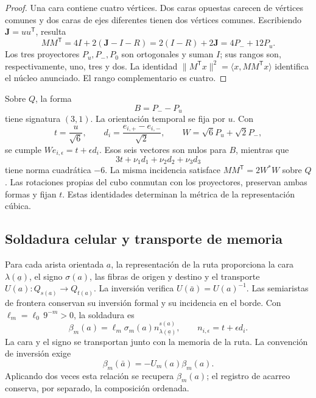 \begin{proof}
Una cara contiene cuatro vértices. Dos caras opuestas carecen de vértices
comunes y dos caras de ejes diferentes tienen dos vértices comunes.
Escribiendo \(\mathbf J=uu^{\mathsf T}\), resulta
\[
 MM^{\mathsf T}=4I+2(\mathbf J-I-R)
 =2(I-R)+2\mathbf J=4P_-+12P_u.
\]
Los tres proyectores \(P_u,P_-,P_0\) son ortogonales y suman \(I\);
sus rangos son, respectivamente, uno, tres y dos. La identidad
\(\|M^{\mathsf T}x\|^2=\langle x,MM^{\mathsf T}x\rangle\)
identifica el núcleo anunciado. El rango complementario es cuatro.
\end{proof}

Sobre \(Q\), la forma
\[
 B=P_--P_u
\]
tiene signatura \((3,1)\). La orientación temporal se fija por \(u\).
Con
\[
 t=\frac{u}{\sqrt6},\qquad
 d_i=\frac{e_{i,+}-e_{i,-}}{\sqrt2},\qquad
 W=\sqrt6P_u+\sqrt2P_-,
\]
se cumple \(We_{i,\epsilon}=t+\epsilon d_i\). Esos seis vectores
son nulos para \(B\), mientras que
\[
 3t+\nu_1d_1+\nu_2d_2+\nu_3d_3
\]
tiene norma cuadrática \(-6\). La misma incidencia satisface
\(MM^{\mathsf T}=2W^*W\) sobre \(Q\). Las rotaciones propias del cubo
conmutan con los proyectores, preservan ambas formas y fijan \(t\).
Estas identidades determinan la métrica de la representación cúbica.

\subsection{Soldadura celular y transporte de memoria}
\label{vii:sec:soldadura-celular}

Para cada arista orientada \(a\), la representación de la ruta proporciona
la cara \(\lambda(\underline a)\), el signo
\(\sigma(a)\), las fibras de origen y destino y el transporte
\(U(a):Q_{s(a)}\longrightarrow Q_{t(a)}\).
La inversión verifica \(U(\bar a)=U(a)^{-1}\).
Las semiaristas de frontera conservan su inversión formal y su incidencia
en el borde. Con \(\ell_m=\ell_0\,9^{-m}>0\), la soldadura es
\begin{equation}
 \beta_m(a)=\ell_m\sigma_m(a)
              n_{\lambda(\underline a)}^{s(a)},\qquad
 n_{i,\epsilon}=t+\epsilon d_i.
 \label{vii:eq:soldadura-arista}
\end{equation}
La cara y el signo se transportan junto con la memoria de la ruta.
La convención de inversión exige
\begin{equation}
 \beta_m(\bar a)=-U_m(a)\beta_m(a).
 \label{vii:eq:inversion-soldadura}
\end{equation}
Aplicando dos veces esta relación se recupera \(\beta_m(a)\);
el registro de acarreo conserva, por separado, la composición ordenada.

